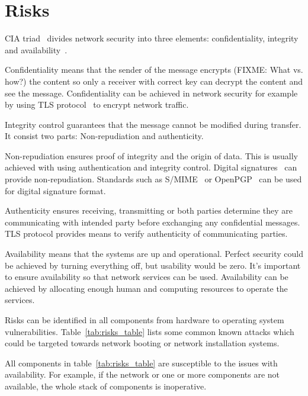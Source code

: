 \section{Risks}


CIA triad~\cite{cia-triad} divides network security into three
elements: confidentiality, integrity and availability~\cite{anderson}.

Confidentiality means that the sender of the message encrypts (FIXME:
What vs. how?) the content so only a receiver with correct key can
decrypt the content and see the message. Confidentiality can be
achieved in network security for example by using TLS
protocol~\cite{RFC5246} to encrypt network traffic.

Integrity control guarantees that the message cannot be modified
during transfer. It consist two parts: Non-repudiation and
authenticity.

Non-repudiation ensures proof of integrity and the origin of
data. This is usually achieved with using authentication and integrity
control. Digital signatures~\cite{Diffie2006}\cite{Goldwasser1988} can
provide non-repudiation. Standards such as S/MIME~\cite{RFC5751} or
OpenPGP~\cite{RFC4880} can be used for digital signature format.

Authenticity ensures receiving, transmitting or both parties determine
they are communicating with intended party before exchanging any
confidential messages. TLS protocol provides means to verify
authenticity of communicating parties.

Availability means that the systems are up and operational. Perfect
security could be achieved by turning everything off, but usability
would be zero. It's important to ensure availability so that network
services can be used. Availability can be achieved by allocating
enough human and computing resources to operate the services.

Risks can be identified in all components from hardware to operating
system vulnerabilities. Table~\ref{tab:risks_table} lists some
common known attacks which could be targeted towards network booting
or network installation systems.

All components in table~\ref{tab:risks_table} are susceptible to the
issues with availability. For example, if the network or one or more
components are not available, the whole stack of components is
inoperative.

